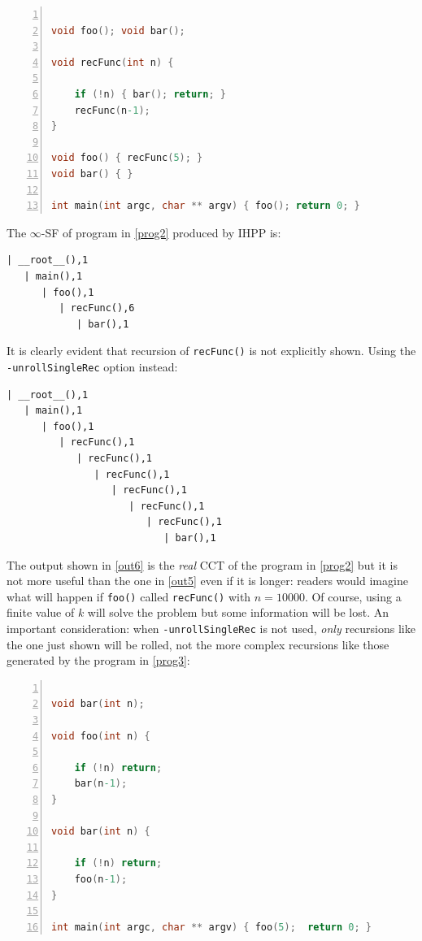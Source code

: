 \documentclass[a4paper,10pt]{report}
\begin{document}
\begin{lstlisting}[language=C, 
	caption={prog2.c, a simple program that uses recursion}, 
	label=prog2, frame=leftline, numbers=left]

void foo(); void bar();

void recFunc(int n) {

	if (!n) { bar(); return; }
	recFunc(n-1);
}

void foo() { recFunc(5); }
void bar() { }

int main(int argc, char ** argv) { foo(); return 0; }

\end{lstlisting}

\noindent
The $\infty$-SF of program in \cref{prog2} produced by IHPP is:

\begin{lstlisting}[label=out5, caption={an example of $k$-SF \emph{without} the \texttt{unrollSingleRec} option}, frame=bottomline]
| __root__(),1
   | main(),1
      | foo(),1
         | recFunc(),6
            | bar(),1
\end{lstlisting}

\noindent
It is clearly evident that recursion of \verb|recFunc()| is not explicitly shown.
Using the \verb|-unrollSingleRec| option instead:
\begin{lstlisting}[label=out6, caption={an example of $k$-SF \emph{with} the \texttt{unrollSingleRec} option}, frame=bottomline]
| __root__(),1
   | main(),1
      | foo(),1
         | recFunc(),1
            | recFunc(),1
               | recFunc(),1
                  | recFunc(),1
                     | recFunc(),1
                        | recFunc(),1
                           | bar(),1
\end{lstlisting}

\noindent
The output shown in \cref{out6} is the \emph{real} CCT of the program in \cref{prog2} 
but it is not more useful than the one in \cref{out5} even if it is longer: readers
would imagine what will happen if \verb|foo()| called \verb|recFunc()| with $n=10000$. 
Of course, using a finite value of $k$ will solve the problem but some information will be lost. An important consideration: when \verb|-unrollSingleRec| is not used, \emph{only} 
recursions like the one just shown will be rolled, not the more complex recursions like 
those generated by the program in \cref{prog3}:

\begin{lstlisting}[language=C, 
	caption={prog3.c, a program that uses complex recursions}, label=prog3, 
	frame=leftline, numbers=left]

void bar(int n);

void foo(int n) {
	
	if (!n) return;
	bar(n-1);
}

void bar(int n) {

	if (!n) return;
	foo(n-1);
}

int main(int argc, char ** argv) { foo(5);	return 0; }

\end{lstlisting}
\end{document}
